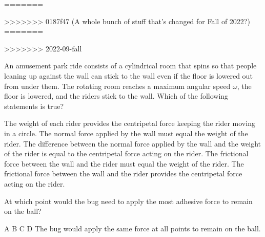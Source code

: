 \documentclass{../../oss-apphys-exam}
\begin{document}
\begin{multicols*}{2}
\begin{questions}
{{=======

>>>>>>> 0187f47 (A whole bunch of stuff that's changed for Fall of 2022?)
=======

>>>>>>> 2022-09-fall
    
    \question An amusement park ride consists of a cylindrical room that spins
    so that people leaning up against the wall can stick to the wall even if the
    floor is lowered out from under them. The rotating room reaches a maximum
    angular speed $\omega$, the floor is lowered, and the riders stick to
    the wall. Which of the following statements is true?
    \begin{choices}
      \choice The weight of each rider provides the centripetal force keeping
      the rider moving in a circle.
      \choice The normal force applied by the wall must equal the weight of the
      rider.
      \choice The difference between the normal force applied by the wall and
      the weight of the rider is equal to the centripetal force acting on the
      rider.
      \choice The frictional force between the wall and the rider must equal the
      weight of the rider.
      \choice The frictional force between the wall and the rider provides the
      centripetal force acting on the rider.
    \end{choices}


    \question At which point would the bug need to apply the most adhesive
    force to remain on the ball?
    \begin{choices}
      \choice A
      \choice B
      \choice C
      \choice D
      \choice The bug would apply the same force at all points to remain on the
      ball.
    \end{choices}
    \label{bug1}
   
}}
\end{questions}
\end{multicols*}
\end{document}
